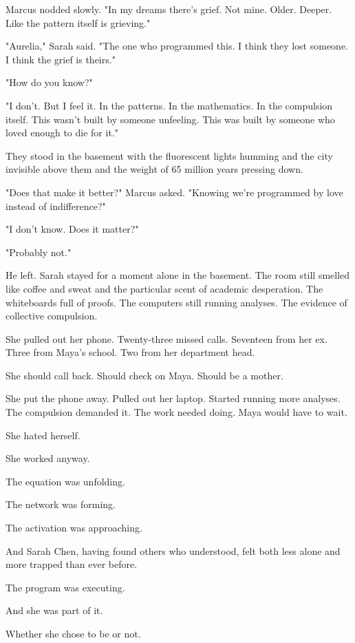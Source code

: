Marcus nodded slowly. "In my dreams there's grief. Not mine. Older. Deeper. Like the pattern itself is grieving."

"Aurelia," Sarah said. "The one who programmed this. I think they lost someone. I think the grief is theirs."

"How do you know?"

"I don't. But I feel it. In the patterns. In the mathematics. In the compulsion itself. This wasn't built by someone unfeeling. This was built by someone who loved enough to die for it."

They stood in the basement with the fluorescent lights humming and the city invisible above them and the weight of 65 million years pressing down.

"Does that make it better?" Marcus asked. "Knowing we're programmed by love instead of indifference?"

"I don't know. Does it matter?"

"Probably not."

He left. Sarah stayed for a moment alone in the basement. The room still smelled like coffee and sweat and the particular scent of academic desperation. The whiteboards full of proofs. The computers still running analyses. The evidence of collective compulsion.

She pulled out her phone. Twenty-three missed calls. Seventeen from her ex. Three from Maya's school. Two from her department head.

She should call back. Should check on Maya. Should be a mother.

She put the phone away. Pulled out her laptop. Started running more analyses. The compulsion demanded it. The work needed doing. Maya would have to wait.

She hated herself.

She worked anyway.

The equation was unfolding.

The network was forming.

The activation was approaching.

And Sarah Chen, having found others who understood, felt both less alone and more trapped than ever before.

The program was executing.

And she was part of it.

Whether she chose to be or not.

